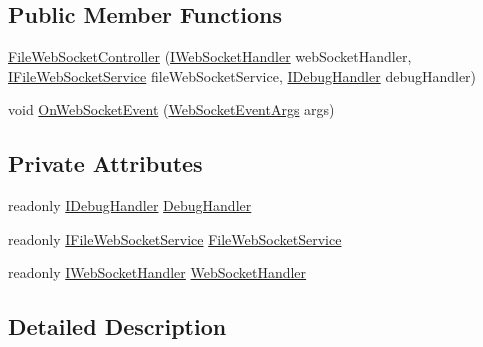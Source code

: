 \subsection*{Public Member Functions}
\begin{DoxyCompactItemize}
\item 
\mbox{\hyperlink{class_little_weeb_library_1_1_controllers_1_1_file_web_socket_controller_a6e297614bf4d98314e6d3583ccdf6dae}{File\+Web\+Socket\+Controller}} (\mbox{\hyperlink{interface_little_weeb_library_1_1_handlers_1_1_i_web_socket_handler}{I\+Web\+Socket\+Handler}} web\+Socket\+Handler, \mbox{\hyperlink{interface_little_weeb_library_1_1_services_1_1_i_file_web_socket_service}{I\+File\+Web\+Socket\+Service}} file\+Web\+Socket\+Service, \mbox{\hyperlink{interface_little_weeb_library_1_1_handlers_1_1_i_debug_handler}{I\+Debug\+Handler}} debug\+Handler)
\item 
void \mbox{\hyperlink{class_little_weeb_library_1_1_controllers_1_1_file_web_socket_controller_a9ecdec41f15ac23a56c402ff2c554a08}{On\+Web\+Socket\+Event}} (\mbox{\hyperlink{class_little_weeb_library_1_1_event_arguments_1_1_web_socket_event_args}{Web\+Socket\+Event\+Args}} args)
\end{DoxyCompactItemize}
\subsection*{Private Attributes}
\begin{DoxyCompactItemize}
\item 
readonly \mbox{\hyperlink{interface_little_weeb_library_1_1_handlers_1_1_i_debug_handler}{I\+Debug\+Handler}} \mbox{\hyperlink{class_little_weeb_library_1_1_controllers_1_1_file_web_socket_controller_a79ef455892623101bcd0acdfdf444831}{Debug\+Handler}}
\item 
readonly \mbox{\hyperlink{interface_little_weeb_library_1_1_services_1_1_i_file_web_socket_service}{I\+File\+Web\+Socket\+Service}} \mbox{\hyperlink{class_little_weeb_library_1_1_controllers_1_1_file_web_socket_controller_abe5b4bdf507c8ea2e86387824fa30df7}{File\+Web\+Socket\+Service}}
\item 
readonly \mbox{\hyperlink{interface_little_weeb_library_1_1_handlers_1_1_i_web_socket_handler}{I\+Web\+Socket\+Handler}} \mbox{\hyperlink{class_little_weeb_library_1_1_controllers_1_1_file_web_socket_controller_a45408070db690e3a794a666995655466}{Web\+Socket\+Handler}}
\end{DoxyCompactItemize}


\subsection{Detailed Description}


